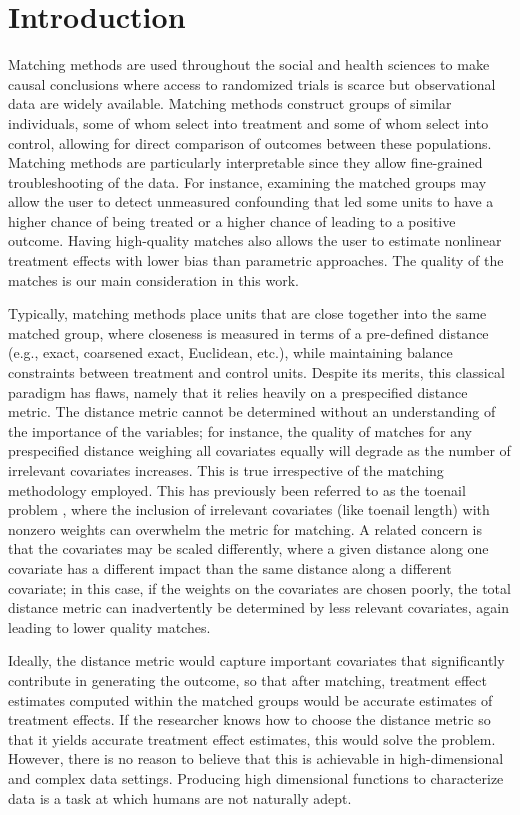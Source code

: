 \section{Introduction}
Matching methods are used throughout the social and health sciences to make causal conclusions where access to randomized trials is scarce but observational data are widely available. 
Matching methods construct groups of similar individuals, some of whom select into treatment and some of whom select into control, allowing for direct comparison of outcomes between these populations. Matching methods are particularly interpretable since they allow fine-grained troubleshooting of the data. 
For instance, examining the matched groups may allow the user to detect unmeasured confounding that led some units to have a higher chance of being treated or a higher chance of leading to a positive outcome.
Having high-quality matches also allows the user to estimate nonlinear treatment effects with lower bias than parametric approaches.
The quality of the matches is our main consideration in this work.

Typically, matching methods place units that are close together into the same matched group, where closeness is measured in terms of a pre-defined distance (e.g., exact, coarsened exact, Euclidean, etc.), while maintaining balance constraints between treatment and control units. Despite its merits, this classical paradigm has flaws, namely that it relies heavily on a prespecified distance metric. The distance metric cannot be determined without an understanding of the importance of the variables;
for instance, the quality of matches for any prespecified distance weighing all covariates equally will degrade as the number of irrelevant covariates increases. 
This is true irrespective of the matching methodology employed.
This has previously been referred to as the toenail problem \citep{wang2017flame, DiengEtAl2018}, where the inclusion of irrelevant covariates (like toenail length) with nonzero weights can overwhelm the metric for matching. A related concern is that the covariates may be scaled differently, where a given distance along one covariate has a different impact than the same distance along a different covariate; in this case, if the weights on the covariates are chosen poorly, the total distance metric can inadvertently be determined by less relevant covariates, again leading to lower quality matches.

Ideally, the distance metric would capture important covariates that significantly contribute in generating the outcome, so that after matching, treatment effect estimates computed within the matched groups would be accurate estimates of treatment effects. If the researcher knows how to choose the distance metric so that it yields accurate treatment effect estimates, this would solve the problem. However, there is no reason to believe that this is achievable in high-dimensional and complex data settings. Producing high dimensional functions to characterize data is a task at which humans are not naturally adept.

